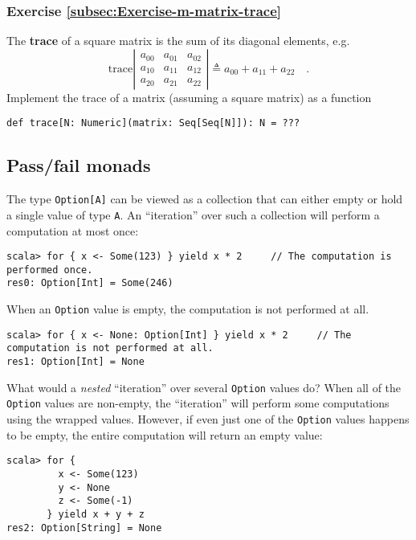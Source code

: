 \subsubsection{Exercise \label{subsec:Exercise-m-matrix-trace}\ref{subsec:Exercise-m-matrix-trace}}

The \textbf{trace} of a square matrix is
the sum of its diagonal elements, e.g.
\[
\text{trace}\left|\begin{array}{ccc}
a_{00} & a_{01} & a_{02}\\
a_{10} & a_{11} & a_{12}\\
a_{20} & a_{21} & a_{22}
\end{array}\right|\triangleq a_{00}+a_{11}+a_{22}\quad.
\]
Implement the trace of a matrix (assuming a square matrix) as a function
\begin{lstlisting}
def trace[N: Numeric](matrix: Seq[Seq[N]]): N = ???
\end{lstlisting}


\subsection{Pass/fail monads}

The type \lstinline!Option[A]! can be viewed as a collection that
can either empty or hold a single value of type \lstinline!A!. An
``iteration'' over such a collection will perform a computation
at most once:
\begin{lstlisting}
scala> for { x <- Some(123) } yield x * 2     // The computation is performed once.
res0: Option[Int] = Some(246) 
\end{lstlisting}
When an \lstinline!Option! value is empty, the computation is not
performed at all.
\begin{lstlisting}
scala> for { x <- None: Option[Int] } yield x * 2     // The computation is not performed at all.
res1: Option[Int] = None
\end{lstlisting}
What would a \emph{nested} ``iteration'' over several \lstinline!Option!
values do? When all of the \lstinline!Option! values are non-empty,
the ``iteration'' will perform some computations using the wrapped
values. However, if even just one of the \lstinline!Option! values
happens to be empty, the entire computation will return an empty value:
\begin{lstlisting}
scala> for {
         x <- Some(123)
         y <- None
         z <- Some(-1)
       } yield x + y + z
res2: Option[String] = None
\end{lstlisting}

